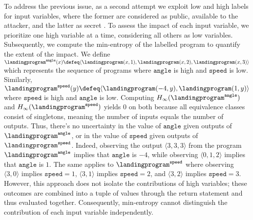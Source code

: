 To address the previous issue, as a second attempt we exploit low and high labels for input variables, where the former are considered as public, available to the attacker, and the latter as secret .
To assess the impact of each input variable, we prioritize one high variable at a time, considering all others as low variables.
Subsequently, we compute the min-entropy of the labelled program to quantify the extent of the impact.
%
%
We define $\landingprogram^{\texttt{angle}}(x)\defeq \langle\landingprogram(x, 1), \landingprogram(x, 2), \landingprogram(x, 3)\rangle$ which represents the sequence of programs where ${\texttt{angle}}$ is high and ${\texttt{speed}}$ is low.
%
Similarly, $\landingprogram^{\texttt{speed}}(y)\defeq\langle\landingprogram(-4, y), \landingprogram(1, y)\rangle$ where ${\texttt{speed}}$ is high and ${\texttt{angle}}$ is low.
%
Computing $\minentropy(\landingprogram^{\texttt{angle}})$ and $\minentropy(\landingprogram^{\texttt{speed}})$ yields 0 on both because all equivalence classes consist of singletons, meaning the number of inputs equals the number of outputs. Thus, there's no uncertainty in the value of ${\texttt{angle}}$ given outputs of $\landingprogram^{\texttt{angle}}$, or in the value of ${\texttt{speed}}$ given outputs of $\landingprogram^{\texttt{speed}}$.
Indeed, observing the output $\langle 3, 3, 3\rangle$ from the program $\landingprogram^{\texttt{angle}}$ implies that ${\texttt{angle}}$ is $-4$, while observing $\langle 0, 1, 2 \rangle$ implies that ${\texttt{angle}}$ is $1$. The same applies to $\landingprogram^{\texttt{speed}}$ where observing $\langle 3, 0 \rangle$ implies ${\texttt{speed}}=1$, $\langle 3, 1\rangle$ implies ${\texttt{speed}}=2$, and $\langle 3, 2\rangle$ implies ${\texttt{speed}}=3$.
%
However, this approach does not isolate the contributions of high variables; these outcomes are combined into a tuple of values through the return statement and thus evaluated together. Consequently, min-entropy cannot distinguish the contribution of each input variable independently.

